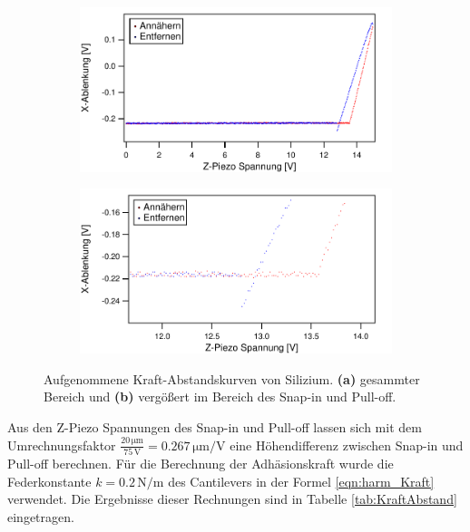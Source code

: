 \begin{figure}[H]
    \begin{subfigure}{0.8\textwidth}
        \includegraphics[width=\textwidth]{bilder/Kraft_Abstand/Si2.pdf}
        \caption{}
    \end{subfigure}
    \begin{subfigure}{0.8\textwidth}
        \includegraphics[width=\textwidth]{bilder/Kraft_Abstand/Si.pdf}
        \caption{}
    \end{subfigure}
    \caption{Aufgenommene Kraft-Abstandskurven von Silizium. \textbf{(a)} gesammter Bereich und \textbf{(b)} vergößert im Bereich des Snap-in und Pull-off.}
    \label{fig:Si}
\end{figure}
Aus den Z-Piezo Spannungen des Snap-in und Pull-off lassen sich mit dem Umrechnungsfaktor $\frac{20\,\si{\micro\meter}}{75\,\si{\volt}}=0.267\,\si{\micro\meter\per\volt}$ \cite{anleitung}
eine Höhendifferenz zwischen Snap-in und Pull-off berechnen. Für die Berechnung der Adhäsionskraft wurde die Federkonstante $k=0.2\,\si{\newton\per\meter}$ \cite{anleitung} des Cantilevers in der Formel \autoref{eqn:harm_Kraft} verwendet.
Die Ergebnisse dieser Rechnungen sind in Tabelle \ref{tab:KraftAbstand} eingetragen.

